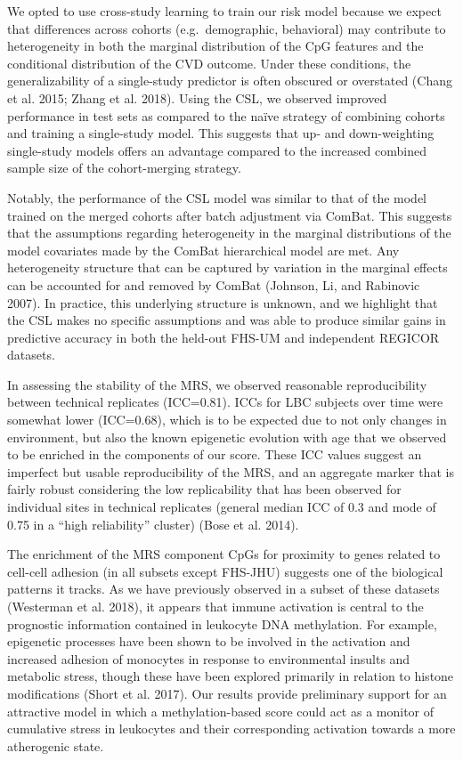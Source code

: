 \documentclass[]{article}
\begin{document}
We opted to use cross-study learning to train our risk model because we
expect that differences across cohorts (e.g.~demographic, behavioral)
may contribute to heterogeneity in both the marginal distribution of the
CpG features and the conditional distribution of the CVD outcome. Under
these conditions, the generalizability of a single-study predictor is
often obscured or overstated (Chang et al. 2015; Zhang et al. 2018).
Using the CSL, we observed improved performance in test sets as compared
to the naïve strategy of combining cohorts and training a single-study
model. This suggests that up- and down-weighting single-study models
offers an advantage compared to the increased combined sample size of
the cohort-merging strategy.

Notably, the performance of the CSL model was similar to that of the
model trained on the merged cohorts after batch adjustment via ComBat.
This suggests that the assumptions regarding heterogeneity in the
marginal distributions of the model covariates made by the ComBat
hierarchical model are met. Any heterogeneity structure that can be
captured by variation in the marginal effects can be accounted for and
removed by ComBat (Johnson, Li, and Rabinovic 2007). In practice, this
underlying structure is unknown, and we highlight that the CSL makes no
specific assumptions and was able to produce similar gains in predictive
accuracy in both the held-out FHS-UM and independent REGICOR datasets.

In assessing the stability of the MRS, we observed reasonable
reproducibility between technical replicates (ICC=0.81). ICCs for LBC
subjects over time were somewhat lower (ICC=0.68), which is to be
expected due to not only changes in environment, but also the known
epigenetic evolution with age that we observed to be enriched in the
components of our score. These ICC values suggest an imperfect but
usable reproducibility of the MRS, and an aggregate marker that is
fairly robust considering the low replicability that has been observed
for individual sites in technical replicates (general median ICC of 0.3
and mode of 0.75 in a ``high reliability'' cluster) (Bose et al. 2014).

The enrichment of the MRS component CpGs for proximity to genes related
to cell-cell adhesion (in all subsets except FHS-JHU) suggests one of
the biological patterns it tracks. As we have previously observed in a
subset of these datasets (Westerman et al. 2018), it appears that immune
activation is central to the prognostic information contained in
leukocyte DNA methylation. For example, epigenetic processes have been
shown to be involved in the activation and increased adhesion of
monocytes in response to environmental insults and metabolic stress,
though these have been explored primarily in relation to histone
modifications (Short et al. 2017). Our results provide preliminary
support for an attractive model in which a methylation-based score could
act as a monitor of cumulative stress in leukocytes and their
corresponding activation towards a more atherogenic state.
\end{document}
